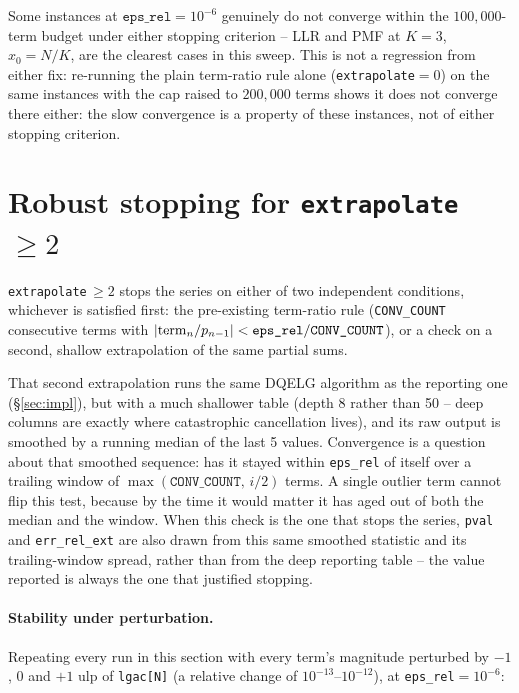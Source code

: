 \documentclass[11pt]{article}
\begin{document}
Some instances at $\texttt{eps\_rel}=10^{-6}$ genuinely do not converge within the $100{,}000$-term
budget under either stopping criterion -- LLR and PMF at $K=3$, $x_0=N/K$, are the clearest cases in
this sweep. This is not a regression from either fix: re-running the plain term-ratio rule alone
(\texttt{extrapolate}$=0$) on the same instances with the cap raised to $200{,}000$ terms shows it
does not converge there either: the slow convergence is a property of these instances, not of
either stopping criterion.

\section{Robust stopping for \texttt{extrapolate} $\ge2$}
\label{sec:stopping}

\texttt{extrapolate}$\,\ge2$ stops the series on either of two independent conditions, whichever is
satisfied first: the pre-existing term-ratio rule (\texttt{CONV\_COUNT} consecutive terms with
$|{\rm term}_n/p_{n-1}|<\texttt{eps\_rel}/\texttt{CONV\_COUNT}$), or a check on a second,
shallow extrapolation of the same partial sums.

That second extrapolation runs the same DQELG algorithm as the reporting one (\S\ref{sec:impl}),
but with a much shallower table (depth 8 rather than 50 -- deep columns are exactly where
catastrophic cancellation lives), and its raw output is smoothed by a running median of the last 5
values. Convergence is a question about that smoothed sequence: has it stayed within
\texttt{eps\_rel} of itself over a trailing window of $\max(\texttt{CONV\_COUNT},\,i/2)$ terms. A
single outlier term cannot flip this test, because by the time it would matter it has aged out of
both the median and the window. When this check is the one that stops the series, \texttt{pval}
and \texttt{err\_rel\_ext} are also drawn from this same smoothed statistic and its trailing-window
spread, rather than from the deep reporting table -- the value reported is always the one that
justified stopping.

\paragraph{Stability under perturbation.} Repeating every run in this section with every term's
magnitude perturbed by $-1$, $0$ and $+1$ ulp of \texttt{lgac[N]} (a relative change of
$10^{-13}$--$10^{-12}$), at \texttt{eps\_rel}$=10^{-6}$:
\end{document}
